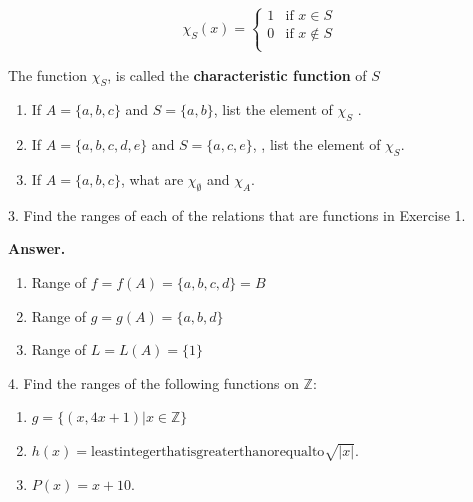 \documentclass[10pt,]{book}
\newcommand{\terminology}[1]{\textbf{#1}}
\theoremstyle{plain}
\theoremstyle{definition}
\theoremstyle{definition}
\theoremstyle{definition}
\begin{document}
\begin{exercisegroup}
\begin{equation*}\chi _S(x)= \left\{
\begin{array}{cc}
 1 & \textrm{if } x\in S \\
 0 & \textrm{if } x\notin S \\
\end{array}
\right.
\end{equation*}
%
\par
The function \(\chi _S\), is called the \terminology{characteristic function} of \(S\)%
\par
\leavevmode%
\begin{enumerate}[label=(\alph*)]
\item\hypertarget{li-13}{} If \(A = \{a, b, c\}\) and \(S = \{a, b\}\), list the element of \(\chi _S\) .%
\item\hypertarget{li-14}{} If \(A = \{a, b, c, d, e\}\) and \(S = \{a, c, e\}\), , list the element of \(\chi _S\).%
\item\hypertarget{li-15}{} If \(A = \{a, b, c\}\), what are \(\chi _{\emptyset }\) and \(\chi _A\).%
\end{enumerate}
%
\par\smallskip
\item[3.]\hypertarget{exercise-3}{} Find the ranges of each of the relations that are functions in Exercise 1.%
\par\smallskip
\par\smallskip
\noindent\textbf{Answer.}\hypertarget{answer-2}{}\quad
\leavevmode%
\begin{enumerate}[label=\alph*]
\item\hypertarget{li-16}{} Range of \(f=f(A)=\{a,b,c,d\}=B\)%
\item\hypertarget{li-17}{} Range of \(g=g(A)=\{a,b,d\}\)%
\item\hypertarget{li-18}{} Range of \(L=L(A)=\{1\}\)%
\end{enumerate}
%
\item[4.]\hypertarget{exercise-4}{} Find the ranges of the following functions on \(\mathbb{Z}\):%
\par
\leavevmode%
\begin{enumerate}[label=\alph*]
\item\hypertarget{li-19}{} \(g = \{(x, 4x +1)|x \in  \mathbb{Z}\}\)%
\item\hypertarget{li-20}{} \(h(x) = \text{least} \text{integer} \text{that} \text{is} \text{greater} \text{than} \text{or} \text{equal} \text{to} \sqrt{|x|}\).%
\item\hypertarget{li-21}{} \(P(x) = x + 10\).%

\end{enumerate}
\end{exercisegroup}
\end{document}
